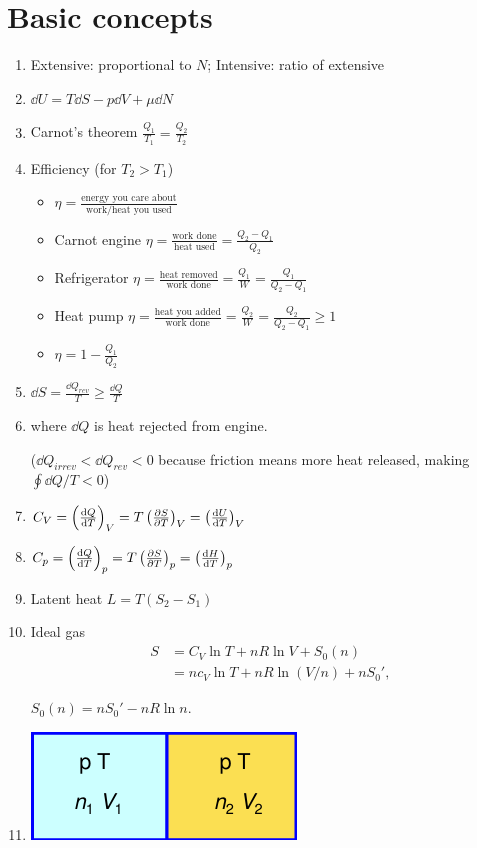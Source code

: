 \documentclass{article}
\theoremstyle{remark}
\newcommand{\where}[1]{\begin{flushright}where #1.\end{flushright}}
\newcommand{\wher}[1]{\begin{flushright}#1.\end{flushright}}
\begin{document}
\section*{Basic concepts}
\begin{enumerate}
    \item Extensive: proportional to $N$; Intensive: ratio of extensive
    \item $\dd U=T\dd S-p\dd V+\mu\dd N$
    \item Carnot's theorem $\frac{Q_1}{T_1}=\frac{Q_2}{T_2}$\newline
    \item Efficiency (for $T_2>T_1$)\begin{itemize}
        \item $\eta=\frac{\text{energy you care about}}{\text{work/heat you used}}$
        \item Carnot engine $\eta=\frac{\text{work done}}{\text{heat used}}=\frac{Q_2-Q_1}{Q_2}$
        \item Refrigerator $\eta=\frac{\text{heat removed}}{\text{work done}}=\frac{Q_1}{W}=\frac{Q_1}{Q_2-Q_1}$
        \item Heat pump $\eta=\frac{\text{heat you added}}{\text{work done}}=\frac{Q_2}{W}=\frac{Q_2}{Q_2-Q_1}\geq 1$
        \item $\eta=1-\frac{Q_1}{Q_2}$
    \end{itemize}
    \item $\dd S=\frac{\dd Q_{rev}}{T}\boxed{\geq\frac{\dd Q}{T}}$
    \item {}
        \where{$\dd Q$ is heat rejected from engine}
        ($\dd Q_{irrev}<\dd Q_{rev}<0$ because friction means more heat released, making $\textstyle\oint\dd Q/T<0$)
    \item $C_V = \left(\dv{Q}{T}\right)_V = T\left(\pdv{S}{T}\right)_V = \left(\dv{U}{T}\right)_V$
    \item $C_p = \left(\dv{Q}{T}\right)_p = T\left(\pdv{S}{T}\right)_p = \left(\dv{H}{T}\right)_p$
    \item Latent heat $L=T(S_2-S_1)$
    \item Ideal gas \begin{align*}
        S &= C_V\ln T+nR\ln V+S_0(n)\\
          &= nc_V\ln T+nR\ln(V/n)+nS_0',
    \end{align*}\wher{$S_0(n)=nS_0'-nR\ln n$}
    \item \includegraphics*{Entropy_of_mixing.png}\newline

\end{enumerate}
\end{document}
